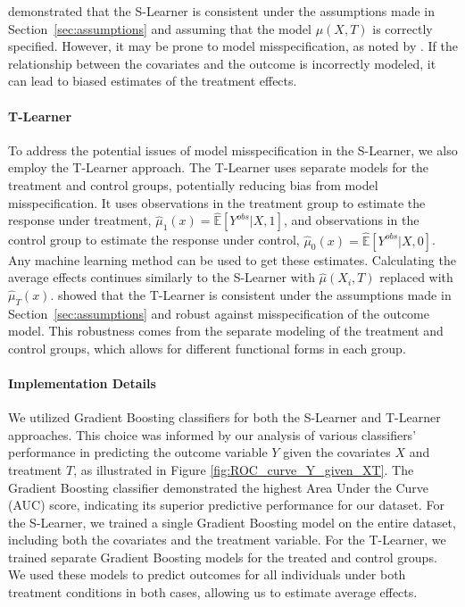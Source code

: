 \documentclass{article}
\begin{document}
\citet{hahn1998role} demonstrated that the S-Learner is consistent under the assumptions made in Section~\ref{sec:assumptions} and assuming that the model $\mu(X,T)$ is correctly specified. However, it may be prone to model misspecification, as noted by \citet{rubin1979using}. If the relationship between the covariates and the outcome is incorrectly modeled, it can lead to biased estimates of the treatment effects.

\paragraph{T-Learner} To address the potential issues of model misspecification in the S-Learner, we also employ the T-Learner approach. The T-Learner uses separate models for the treatment and control groups, potentially reducing bias from model misspecification. It uses observations in the treatment group to estimate the response under treatment, $\hat\mu_1(x) = \hat{\mathbb{E}}[Y^{obs} | X, 1]$, and observations in the control group to estimate the response under control, $\hat\mu_0(x) = \hat{\mathbb{E}}[Y^{obs} | X, 0]$. Any machine learning method can be used to get these estimates. Calculating the average effects continues similarly to the S-Learner with $\hat \mu (X_i, T)$ replaced with $\hat \mu_T(x)$.
\citet{greenland1986identifiability} showed that the T-Learner is consistent under the assumptions made in Section~\ref{sec:assumptions} and robust against misspecification of the outcome model. This robustness comes from the separate modeling of the treatment and control groups, which allows for different functional forms in each group.

\paragraph{Implementation Details} We utilized Gradient Boosting classifiers for both the S-Learner and T-Learner approaches. This choice was informed by our analysis of various classifiers' performance in predicting the outcome variable $Y$ given the covariates $X$ and treatment $T$, as illustrated in Figure \ref{fig:ROC_curve_Y_given_XT}. The Gradient Boosting classifier demonstrated the highest Area Under the Curve (AUC) score, indicating its superior predictive performance for our dataset.
For the S-Learner, we trained a single Gradient Boosting model on the entire dataset, including both the covariates and the treatment variable. For the T-Learner, we trained separate Gradient Boosting models for the treated and control groups. We used these models to predict outcomes for all individuals under both treatment conditions in both cases, allowing us to estimate average effects.
\end{document}
